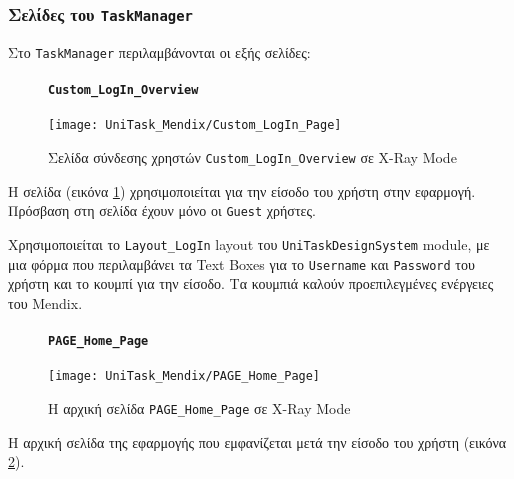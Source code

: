             \subsubsection{Σελίδες του \texttt{TaskManager}}
                Στο \texttt{TaskManager} περιλαμβάνονται οι εξής σελίδες:

                \begin{figure}[H] \noindent
                    \paragraph{\texttt{Custom\_LogIn\_Overview}}
                    \begin{center}
                        \texttt{[image: UniTask\_Mendix/Custom\_LogIn\_Page]}
                        \caption{\centering Σελίδα σύνδεσης χρηστών \texttt{Custom\_LogIn\_Overview} σε X-Ray Mode}
                        \label{fig:unitask_Custom_LogIn_Page}
                    \end{center}
                \end{figure}

                Η σελίδα (εικόνα \ref{fig:unitask_Custom_LogIn_Page}) χρησιμοποιείται για την είσοδο του χρήστη στην εφαρμογή. Πρόσβαση στη σελίδα έχουν μόνο οι \texttt{Guest} χρήστες.

                Χρησιμοποιείται το \texttt{Layout\_LogIn} layout του \texttt{UniTaskDesignSystem} module, με μια φόρμα που περιλαμβάνει τα Text Boxes για το \texttt{Username} και \texttt{Password} του χρήστη και το κουμπί για την είσοδο. Τα κουμπιά καλούν προεπιλεγμένες ενέργειες του Mendix.

                \begin{figure}[H] \noindent
                    \paragraph{\texttt{PAGE\_Home\_Page}}
                    \begin{center}
                        \texttt{[image: UniTask\_Mendix/PAGE\_Home\_Page]}
                        \caption{\centering Η αρχική σελίδα \texttt{PAGE\_Home\_Page} σε X-Ray Mode}
                        \label{fig:unitask_PAGE_Home_Page}
                    \end{center}
                \end{figure}

                Η αρχική σελίδα της εφαρμογής που εμφανίζεται μετά την είσοδο του χρήστη (εικόνα \ref{fig:unitask_PAGE_Home_Page}).

